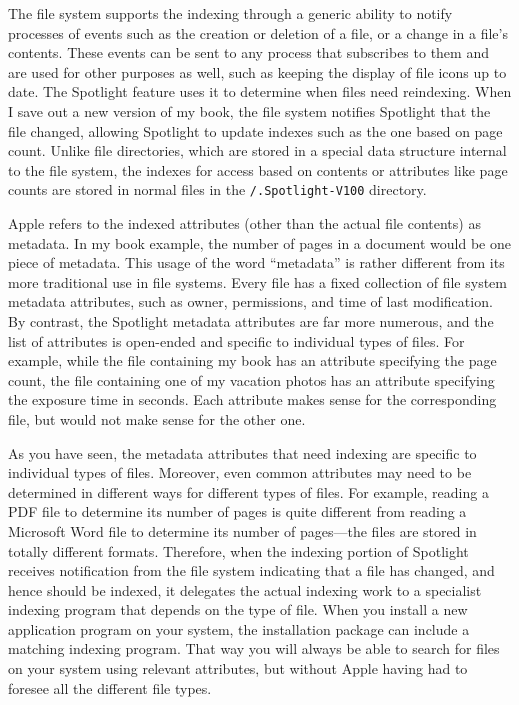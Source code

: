 The file system supports the indexing through a generic ability to
notify processes of events such as the creation or deletion of a file,
or a change in a file's contents.  These events can be sent to any
process that subscribes to them and are used for other purposes as
well, such as keeping the display of file icons up to date.  The
Spotlight feature uses it to determine when files need reindexing.
When I save out a new version of my book, the file system
notifies Spotlight that the file changed, allowing Spotlight to update
indexes such as the one based on page count.  Unlike file directories,
which are stored in a special data structure internal to the
file system, the indexes for access based on contents or attributes
like page counts are stored in normal files in the
\verb|/.Spotlight-V100| directory.

Apple refers to the indexed attributes (other than the actual file
contents) as metadata.  In my book example, the number of pages in a
document would be one piece of metadata.  This usage of the word
``metadata'' is rather different from its more traditional use in
file systems.  Every file has a fixed collection of file system metadata
attributes, such as owner, permissions, and time of last modification.
By contrast, the Spotlight metadata attributes are far more numerous,
and the list of attributes is open-ended and specific to
individual types of files.  For example, while the file containing my
book has an attribute specifying the page count, the file containing one of my
vacation photos has an attribute specifying the exposure time in
seconds.
Each attribute makes sense for the corresponding
file, but would not make sense for the other one.

As you have seen, the metadata attributes that need indexing are
specific to individual types of files.  Moreover, even common
attributes may need to be determined in different ways for different
types of files.  For example, reading a PDF file to determine its
number of pages is quite different from reading a Microsoft Word file
to determine its number of pages---the files are stored in totally
different formats.  Therefore, when the indexing portion of Spotlight
receives notification from the file system indicating that a file has
changed, and hence should be indexed, it delegates the actual indexing
work to a specialist indexing program that depends on the type of
file.  When you install a new application program on your system, the
installation package can include a matching indexing program.  That
way you will always be able to search for files on your system using
relevant attributes, but without Apple having had to foresee all the
different file types.

